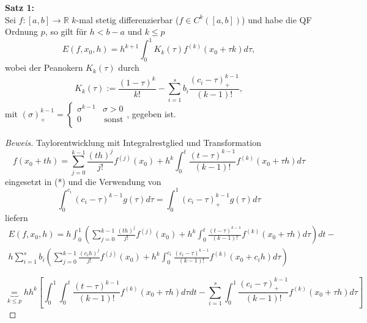 \begin{nothing}
\begin{description}
  \item
\end{description}
\begin{description}
  \item \textbf{Satz 1:} \\
    Sei $f: [a, b] \rightarrow \mathbb{R}$ $k$-mal stetig differenzierbar ($f \in C^k([a, b])$) und habe die QF Ordnung $p$, so gilt für $h < b-a$ und $k \leq p$\\
    $$E(f, x_0, h) = h^{k+1} \int_0^1 K_k(\tau) f^{(k)}(x_0+\tau k) d\tau,$$
    wobei der Peanokern $K_k(\tau)$ durch 
    $$ K_k(\tau) := \frac{(1-\tau)^k}{k!} - \sum_{i=1}^s b_i \frac{(c_i - \tau)^{k-1}_+}{(k-1)!}, $$
    mit 
    $(\sigma)_+^{k-1} = \left\{
    \begin{array}{ll}
    \sigma ^{k-1} &  \sigma > 0 \\
    0 & \, \textrm{sonst} \\
    \end{array}
    \right. $, gegeben ist.
  \item \begin{proof}[Beweis] 
    Taylorentwicklung mit Integralrestglied und Transformation 
    $$f(x_0 + th) = \sum_{j=0}^{k-1} \frac{(th)^j}{j!} f^{(j)}(x_0) + h^k \int_0^t \frac{(t-\tau)^{k-1}}{(k-1)!} f^{(k)}(x_0+\tau h) d\tau$$
    eingesetzt in (*) und die Verwendung von 
    $$\int_0^{c_i} (c_i - \tau)^{k-1} g(\tau) d\tau = \int_0^1 (c_i-\tau)_+^{k-1} g(\tau) d\tau$$
    liefern
    \begin{multline*} 
    E(f, x_0, h)= h 
      \int_0^1 
        \left( 
          \sum_{j=0}^{k-1} 
            \frac{(th)^j}{j!} f^{(j)}(x_0) + h^k 
            \int_0^t 
              \frac{(t-\tau)^{k-1}}{(k-1)!} f^{(k)}(x_0+\tau h) 
            d\tau 
        \right)
      dt - \\h
      \sum_{i=1}^s b_i 
        \left( 
          \sum_{j=0}^{k-1} 
            \frac{(c_ih)^j}{j!} f^{(j)}(x_0) + h^k 
            \int_0^{c_i} 
              \frac{(c_i-\tau)^{k-1}}{(k-1)!} 
              f^{(k)}(x_0+c_ih) 
            d\tau
        \right)
    \end{multline*}
    
    \begin{displaymath}
    \underbrace{=}_{k\leq p} h h^k \left[ \int_0^1 \int_0^t \frac{(t-\tau)^{k-1}}{(k-1)!} f^{(k)} (x_0 + \tau h) d\tau dt - \sum_{i=1}^s \int_0^1 \frac{(c_i-\tau)^{k-1}_+}{(k-1)!} f^{(k)}(x_0+\tau h) d\tau \right]
    \end{displaymath}
    

\end{proof}
\end{description}
\end{nothing}
